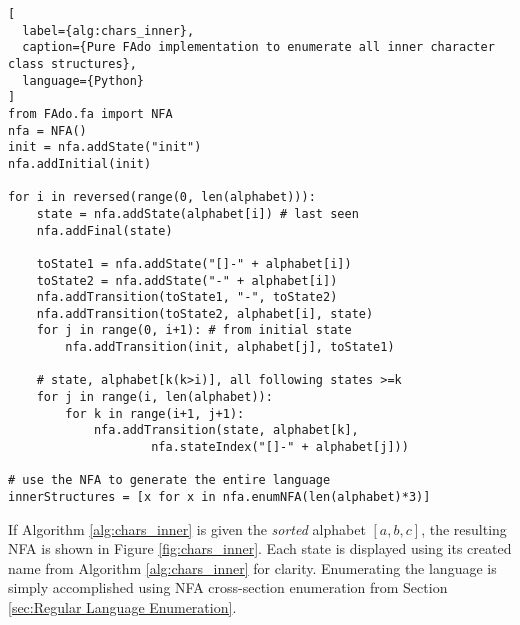 \begin{lstlisting}[
  label={alg:chars_inner}, 
  caption={Pure FAdo implementation to enumerate all inner character class structures}, 
  language={Python}
]
from FAdo.fa import NFA
nfa = NFA()
init = nfa.addState("init")
nfa.addInitial(init)

for i in reversed(range(0, len(alphabet))):
    state = nfa.addState(alphabet[i]) # last seen
    nfa.addFinal(state)

    toState1 = nfa.addState("[]-" + alphabet[i])
    toState2 = nfa.addState("-" + alphabet[i])
    nfa.addTransition(toState1, "-", toState2)
    nfa.addTransition(toState2, alphabet[i], state)
    for j in range(0, i+1): # from initial state
        nfa.addTransition(init, alphabet[j], toState1)

    # state, alphabet[k(k>i)], all following states >=k
    for j in range(i, len(alphabet)):
        for k in range(i+1, j+1):
            nfa.addTransition(state, alphabet[k], 
                    nfa.stateIndex("[]-" + alphabet[j]))

# use the NFA to generate the entire language
innerStructures = [x for x in nfa.enumNFA(len(alphabet)*3)]
\end{lstlisting}

If Algorithm \ref{alg:chars_inner} is given the \emph{sorted} alphabet $[a,b,c]$, the resulting NFA is shown in Figure \ref{fig:chars_inner}. Each state is displayed using its created name from Algorithm \ref{alg:chars_inner} for clarity. Enumerating the language is simply accomplished using NFA cross-section enumeration from Section \ref{sec:Regular Language Enumeration}.

